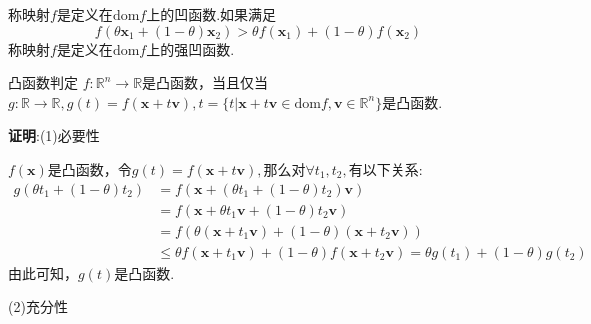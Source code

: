 称映射$f$是定义在$\mathrm{dom} f$上的凹函数.如果满足
\begin{equation}
f(\theta\boldsymbol{x}_1+(1-\theta)\boldsymbol{x}_2)>\theta f(\boldsymbol{x}_1) + (1-\theta)f(\boldsymbol{x}_2)~
\end{equation}
称映射$f$是定义在$\mathrm{dom} f$上的强凹函数.
\begin{theorem}{凸函数判定}
$f:\mathbb{R}^n\to\mathbb{R}$是凸函数，当且仅当$g:\mathbb{R}\to\mathbb{R},g(t)=f(\boldsymbol{x}+t\boldsymbol{v}),t=\{t|\boldsymbol{x}+t\boldsymbol{v}\in\mathrm{dom} f,\boldsymbol{v}\in\mathbb{R}^n\}$是凸函数.
\end{theorem}
\textbf{证明}:(1)必要性

$f(\boldsymbol{x})$是凸函数，令$g(t)=f(\boldsymbol{x}+t\boldsymbol{v}),$那么对$\forall t_1,t_2,$有以下关系:
$$
\begin{aligned}
g\left( \theta t_1+\left( 1-\theta \right) t_2 \right) &=f\left( \boldsymbol{x}+\left( \theta t_1+\left( 1-\theta \right) t_2 \right) \boldsymbol{v} \right)\\
&=f\left( \boldsymbol{x}+\theta t_1\boldsymbol{v}+\left( 1-\theta \right) t_2\boldsymbol{v} \right)\\
&=f\left( \theta \left( \boldsymbol{x}+t_1\boldsymbol{v} \right) +\left( 1-\theta \right) \left( \boldsymbol{x}+t_2\boldsymbol{v} \right) \right) \\
&\leqslant \theta f\left( \boldsymbol{x}+t_1\boldsymbol{v} \right) +\left( 1-\theta \right) f\left( \boldsymbol{x}+t_2\boldsymbol{v} \right) =\theta g\left( t_1 \right) +\left( 1-\theta \right) g\left( t_2 \right)
\end{aligned}~
$$
由此可知，$g(t)$是凸函数.

(2)充分性

